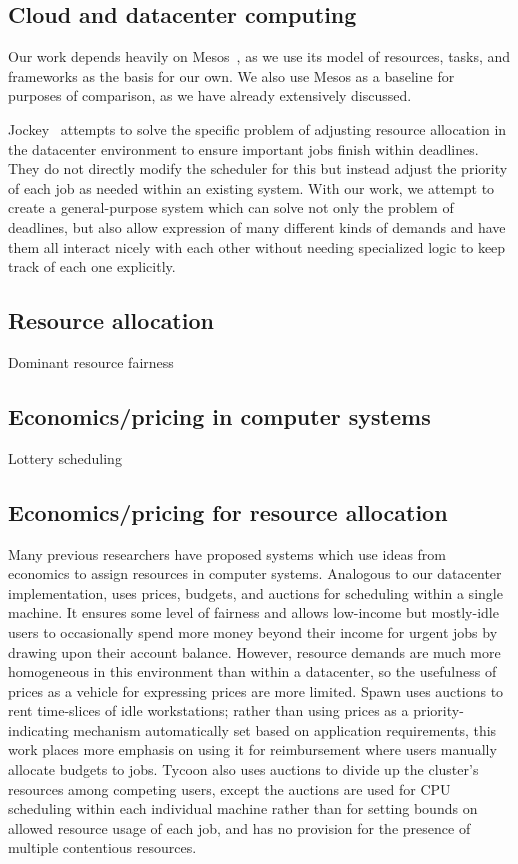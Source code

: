 \documentclass{acm_proc_article-sp}
\begin{document}
\subsection{Cloud and datacenter computing}
Our work depends heavily on Mesos~\cite{mesos}, as we use its model of
resources, tasks, and frameworks as the basis for our own. We also use Mesos as
a baseline for purposes of comparison, as we have already extensively discussed.

Jockey~\cite{jockey} attempts to solve the specific problem of adjusting
resource allocation in the datacenter environment to ensure important jobs
finish within deadlines. They do not directly modify the scheduler for this but
instead adjust the priority of each job as needed within an existing system.
With our work, we attempt to create a general-purpose system which can solve not
only the problem of deadlines, but also allow expression of many different kinds
of demands and have them all interact nicely with each other without needing
specialized logic to keep track of each one explicitly.

\subsection{Resource allocation}
Dominant resource fairness~\cite{drf} 

\subsection{Economics/pricing in computer systems}
Lottery scheduling

\subsection{Economics/pricing for resource allocation}
Many previous researchers have proposed systems which use ideas from economics
to assign resources in computer systems.  Analogous to our datacenter
implementation, \cite{stoica94} uses prices, budgets, and auctions for
scheduling within a single machine. It ensures some level of fairness and
allows low-income but mostly-idle users to occasionally spend more money beyond
their income for urgent jobs by drawing upon their account balance. However,
resource demands are much more homogeneous in this environment than within a
datacenter, so the usefulness of prices as a vehicle for expressing prices are
more limited. Spawn \cite{spawn} uses auctions to rent time-slices of idle
workstations; rather than using prices as a priority-indicating mechanism
automatically set based on application requirements, this work places more
emphasis on using it for reimbursement where users manually allocate budgets to
jobs. Tycoon \cite{tycoon} also uses auctions to divide up the cluster's
resources among competing users, except the auctions are used for CPU scheduling
within each individual machine rather than for setting bounds on allowed
resource usage of each job, and has no provision for the presence of
multiple contentious resources.
\end{document}
